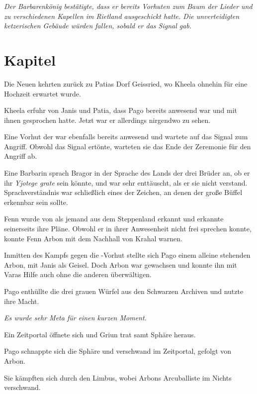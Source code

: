 \textit{Der Barbarenkönig bestätigte, dass er bereits Vorhuten zum Baum der Lieder und zu verschiedenen Kapellen im Rietland ausgeschickt hatte. Die unverteidigten ketzerischen Gebäude würden fallen, sobald er das Signal gab.}


\newpage
\section{Kapitel}

Die Neuen  kehrten zurück zu Patias Dorf Geissried, wo Kheela ohnehin für eine Hochzeit erwartet wurde.

Kheela erfuhr von Janis und Patia, dass Pago bereits anwesend war und mit ihnen gesprochen hatte. Jetzt war er allerdings nirgendwo zu sehen.

Eine Vorhut der  war ebenfalls bereits anwesend und wartete auf das Signal zum Angriff. Obwohl das Signal ertönte, warteten sie das Ende der Zeremonie für den Angriff ab.

Eine Barbarin sprach Bragor in der Sprache des Lands der drei Brüder an, ob er ihr \textit{Yjotege grate} sein könnte, und war sehr enttäuscht, als er sie nicht verstand. Sprachverständnis war schließlich eines der Zeichen, an denen der große Büffel erkennbar sein sollte.

Fenn wurde von  als jemand aus dem Steppenland erkannt und erkannte seinerseits ihre Pläne. Obwohl er in ihrer Anwesenheit nicht frei sprechen konnte, konnte Fenn Arbon mit dem Nachhall von Krahal warnen.

Inmitten des Kampfs gegen die -Vorhut stellte sich Pago einem alleine stehenden Arbon, mit Janis als Geisel. Doch Arbon war gewachsen und konnte ihn mit Varas Hilfe auch ohne die anderen überwältigen.

Pago enthüllte die drei grauen Würfel aus den Schwarzen Archiven und nutzte ihre Macht.

\trennzeichen

\textit{Es wurde sehr Meta für einen kurzen Moment.}

\trennzeichen

Ein Zeitportal öffnete sich und Griun trat samt Sphäre heraus.

Pago schnappte sich die Sphäre und verschwand im Zeitportal, gefolgt von Arbon.

Sie kämpften sich durch den Limbus, wobei Arbons Arcuballiste im Nichts verschwand.

